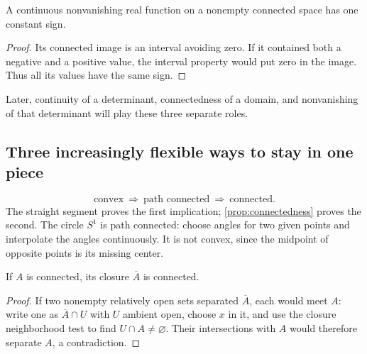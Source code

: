 \begin{corollary}\label{cor:connected-constant-sign}
A continuous nonvanishing real function on a nonempty connected space has
one constant sign.
\end{corollary}
\begin{proof}
Its connected image is an interval avoiding zero. If it contained both a
negative and a positive value, the interval property would put zero in the
image. Thus all its values have the same sign.
\end{proof}
Later, continuity of a determinant, connectedness of a domain, and
nonvanishing of that determinant will play these three separate roles.


\subsection{Three increasingly flexible ways to stay in one piece}
\[
\boxed{\text{convex}\ \Longrightarrow\ \text{path connected}
\ \Longrightarrow\ \text{connected}.}
\]
The straight segment proves the first implication; \cref{prop:connectedness}
proves the second. The circle $S^1$ is path connected: choose angles for
two given points and interpolate the angles continuously. It is not convex,
since the midpoint of opposite points is its missing center.


\begin{proposition}\label{prop:connected-closure}
If $A$ is connected, its closure $\overline A$ is connected.
\end{proposition}
\begin{proof}
If two nonempty relatively open sets separated $\overline A$, each would
meet $A$: write one as $\overline A\cap U$ with $U$ ambient open, choose
$x$ in it, and use the closure neighborhood test to find $U\cap A\ne\varnothing$.
Their intersections with $A$ would therefore separate $A$, a contradiction.
\end{proof}

